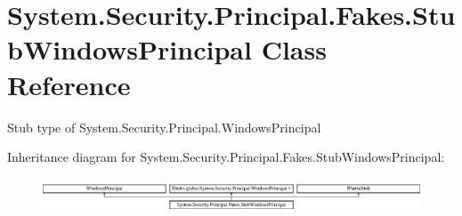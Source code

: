 \hypertarget{class_system_1_1_security_1_1_principal_1_1_fakes_1_1_stub_windows_principal}{\section{System.\-Security.\-Principal.\-Fakes.\-Stub\-Windows\-Principal Class Reference}
\label{class_system_1_1_security_1_1_principal_1_1_fakes_1_1_stub_windows_principal}
}


Stub type of System.\-Security.\-Principal.\-Windows\-Principal 


Inheritance diagram for System.\-Security.\-Principal.\-Fakes.\-Stub\-Windows\-Principal\-:\begin{figure}[H]
\begin{center}
\leavevmode
\includegraphics[height=1.039926cm]{class_system_1_1_security_1_1_principal_1_1_fakes_1_1_stub_windows_principal}
\end{center}
\end{figure}
